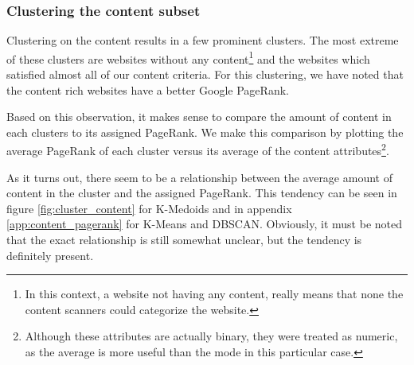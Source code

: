 \subsubsection{Clustering the content subset}

Clustering on the content results in a few prominent clusters. The most extreme of these clusters are websites without any content\footnote{In this context, a website not having any content, really means that none the content scanners could categorize the website.} and the websites which satisfied almost all of our content criteria. For this clustering, we have noted that the content rich websites have a better {Google PageRank}.

Based on this observation, it makes sense to compare the amount of content in each clusters to its assigned {PageRank}. We make this comparison by plotting the average {PageRank} of each cluster versus its average of the content attributes\footnote{Although these attributes are actually binary, they were treated as numeric, as the average is more useful than the mode in this particular case.}.

As it turns out, there seem to be a relationship between the average amount of content in the cluster and the assigned {PageRank}. This tendency can be seen in figure \ref{fig:cluster_content} for {K-Medoids} and in appendix \ref{app:content_pagerank} for {K-Means} and {DBSCAN}. Obviously, it must be noted that the exact relationship is still somewhat unclear, but the tendency is definitely present.



